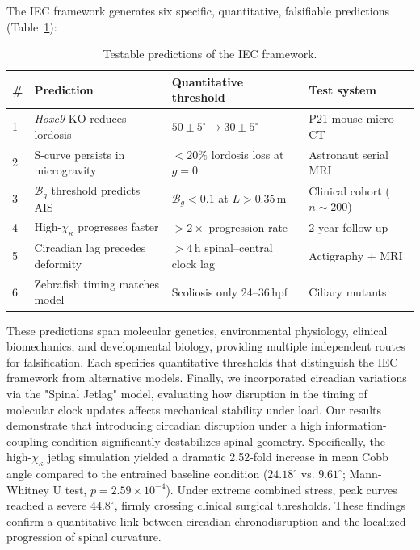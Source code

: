 \documentclass[11pt]{article}
\begin{document}
The IEC framework generates six specific, quantitative, falsifiable predictions (Table~\ref{tab:predictions}):

\begin{table}[h!]
\centering
\caption{Testable predictions of the IEC framework.}
\label{tab:predictions}
\small
\begin{tabular}{p{0.3cm} p{3.8cm} p{3.5cm} p{3.0cm}}
\toprule
\textbf{\#} & \textbf{Prediction} & \textbf{Quantitative threshold} & \textbf{Test system} \\
\midrule
1 & \textit{Hoxc9} KO reduces lordosis & $50{\pm}5^\circ \to 30{\pm}5^\circ$ & P21 mouse micro-CT \\
2 & S-curve persists in microgravity & ${<}20\%$ lordosis loss at $g{=}0$ & Astronaut serial MRI \\
3 & $\mathcal{B}_g$ threshold predicts AIS & $\mathcal{B}_g {<} 0.1$ at $L{>}0.35$\,m & Clinical cohort ($n{\sim}200$) \\
4 & High-$\chi_\kappa$ progresses faster & ${>}2{\times}$ progression rate & 2-year follow-up \\
5 & Circadian lag precedes deformity & ${>}4$\,h spinal--central clock lag & Actigraphy + MRI \\
6 & Zebrafish timing matches model & Scoliosis only 24--36\,hpf & Ciliary mutants \\
\bottomrule
\end{tabular}
\end{table}

These predictions span molecular genetics, environmental physiology, clinical biomechanics, and developmental biology, providing multiple independent routes for falsification. Each specifies quantitative thresholds that distinguish the IEC framework from alternative models.
Finally, we incorporated circadian variations via the "Spinal Jetlag" model, evaluating how disruption in the timing of molecular clock updates affects mechanical stability under load. Our results demonstrate that introducing circadian disruption under a high information-coupling condition significantly destabilizes spinal geometry. Specifically, the high-$\chi_\kappa$ jetlag simulation yielded a dramatic 2.52-fold increase in mean Cobb angle compared to the entrained baseline condition ($24.18^\circ$ vs. $9.61^\circ$; Mann-Whitney U test, $p = 2.59\times 10^{-4}$). Under extreme combined stress, peak curves reached a severe $44.8^\circ$, firmly crossing clinical surgical thresholds. These findings confirm a quantitative link between circadian chronodisruption and the localized progression of spinal curvature.
\end{document}
